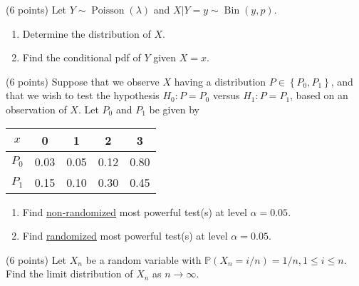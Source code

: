 \documentclass[answers]{exam}
\newcommand{\opn}{\operatorname}
\begin{document}
\begin{questions}
\begin{solution}
   \end{solution}
   \question
   (6 points) Let $Y \sim \opn{Poisson}\left(\lambda\right)$ and $X|Y=y \sim \opn{Bin}\left(y,p\right)$.
   \begin{enumerate}[label=(\alph*)]
   \item Determine the distribution of $X$.
   \item Find the conditional pdf of $Y$ given $X=x$.
   \end{enumerate}
   \begin{solution}

   \end{solution}
   \begin{solution}

   \end{solution}
   \question
   (6 points) Suppose that we observe $X$ having a distribution $P \in \left\{P_{0}, P_{1} \right\}$, and that we wish to test the hypothesis $H_{0}: P= P_{0}$ versus $H_{1}: P=P_{1}$, based on an observation of $X$. Let $P_{0}$ and $P_{1}$ be given by
   \begin{table}[!htbp]
      \centering
        \begin{tabular}{*5c}
          \toprule
          $x$ & 0 & 1 & 2 & 3\\
          \midrule
          $P_{0}$ & 0.03 & 0.05 & 0.12 & 0.80\\
          $P_{1}$ & 0.15 & 0.10 & 0.30 & 0.45\\
          \bottomrule
        \end{tabular}
      \end{table}
   \begin{enumerate}[label=(\alph*)]
      \item Find \underline{non-randomized} most powerful test(s) at level $\alpha = 0.05$.
      \item Find \underline{randomized} most powerful test(s) at level $\alpha=0.05$.
   \end{enumerate}
   \begin{solution}

   \end{solution}
   \begin{solution}

   \end{solution}
   \question
   (6 points) Let $X_{n}$ be a random variable with $\mathbb{P}\left(X_{n}=i/n\right) = 1/n, 1\leq i \leq n$. Find the limit distribution of $X_{n}$ as $n \to \infty$.
   \begin{solution}
   
   \end{solution}
\end{questions}
\end{document}
